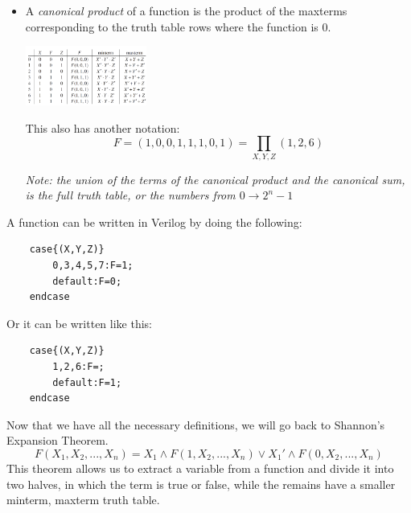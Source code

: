 \documentclass[nobib]{tufte-handout}
\begin{document}
\begin{itemize}
\begin{equation*}
          \end{equation*}
    \item A \textit{canonical product} of a function is the product of the maxterms
          corresponding to the truth table rows where the function is 0.
          \begin{center}
              \includegraphics[width = 150px]{images/minterm_maxterm_func.png}
          \end{center}
          This also has another notation:
          \begin{equation*}
              F = (1,0,0,1,1,1,0,1)=\prod_{X,Y,Z}(1,2,6)
          \end{equation*}
          \begin{center}
              \textit{Note: the union of the terms of the canonical product and the canonical sum, is the full truth table, or the numbers from $0\rightarrow 2^n-1$}
          \end{center}
\end{itemize}
A function can be written in Verilog by doing the following:
\begin{lstlisting}
    case{(X,Y,Z)}
        0,3,4,5,7:F=1;
        default:F=0;
    endcase
\end{lstlisting}
Or it can be written like this:
\begin{lstlisting}
    case{(X,Y,Z)}
        1,2,6:F=;
        default:F=1;
    endcase
\end{lstlisting}
Now that we have all the necessary definitions, we will go back to Shannon's
Expansion Theorem.
\begin{equation*}
    F(X_1, X_2, . . . , X_n) =X_1 \land F(1, X_2, . . . , X_n) \lor X_1' \land F(0, X_2, . . . , X_n)
\end{equation*}
This theorem allows us to extract a variable from a function and divide it into two halves, in which the term is true or false, while the remains have a smaller minterm, maxterm truth table.\\
\end{document}
